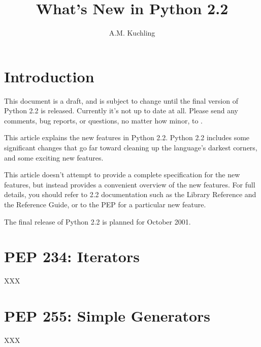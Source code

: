 \documentclass{howto}
\title{What's New in Python 2.2}
\author{A.M. Kuchling}
\begin{document}
\maketitle\tableofcontents

\section{Introduction}

{\large This document is a draft, and is subject to change until the
final version of Python 2.2 is released.  Currently it's not up to
date at all.  Please send any comments, bug reports, or questions, no
matter how minor, to .  }

This article explains the new features in Python 2.2.  Python 2.2
includes some significant changes that go far toward cleaning up the
language's darkest corners, and some exciting new features.

This article doesn't attempt to provide a complete specification for
the new features, but instead provides a convenient overview of the
new features.  For full details, you should refer to 2.2 documentation
such as the Library Reference and the Reference Guide, or to the PEP
for a particular new feature.

The final release of Python 2.2 is planned for October 2001.

\section{PEP 234: Iterators}

XXX

\begin{seealso}


\end{seealso}

\section{PEP 255: Simple Generators}

XXX

\begin{seealso}


\end{seealso}
\end{document}
